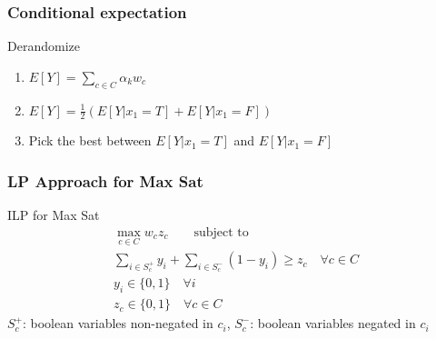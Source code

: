 \documentclass[12pt,aspectratio=169]{beamer}
\begin{document}
\begin{frame}\frametitle{Conditional expectation}
  \begin{block}{Derandomize}
    \begin{enumerate} 
    \item
      $E[Y] = \sum_{c\in C} \alpha_{k} w_{c}$
    \item
      $E[Y] = \frac{1}{2} \left(E[Y|x_{1} = T] +E[Y|x_{1} = F] \right)$
    \item
      Pick the best between $E[Y|x_{1} = T]$ and $E[Y|x_{1} = F]$
    \end{enumerate}
  \end{block}
\end{frame}

\begin{frame}\frametitle{LP Approach for Max Sat}
  \begin{block}{ILP for Max Sat}
  \begin{equation}
    \begin{split}
      \max_{c\in C}w_{c}z_{c}\qquad\text{subject to}\\
      \sum_{i\in S_{c}^{+}}y_{i} + \sum_{i\in S_{c}^{-}}(1 - y_{i})\ge z_{c}\quad \forall c\in C\\
      y_{i}\in \{0, 1\}\quad \forall i\\
      z_{c}\in \{0, 1\}\quad \forall c\in C
     \end{split}
   \end{equation}
   $S_{c}^{+}$: boolean variables non-negated in $c_{i}$,  $S_{c}^{-}$: boolean variables negated in $c_{i}$
 \end{block}
\end{frame}
\end{document}
